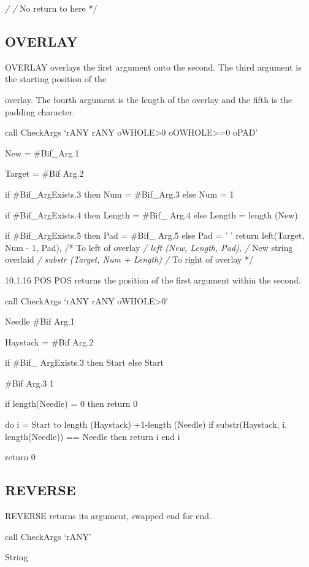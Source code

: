 \emph{/ /} No return to here */

\hypertarget{overlay}{%
\subsection{OVERLAY}\label{overlay}}

OVERLAY overlays the first argument onto the second. The third argument
is the starting position of the

overlay. The fourth argument is the length of the overlay and the fifth
is the padding character.

call CheckArgs `rANY rANY oWHOLE\textgreater0 oOWHOLE\textgreater=0
oPAD'

New = \#Bif\_Arg.1

Target = \#Bif Arg.2

if \#Bif\_ArgExists.3 then Num = \#Bif\_Arg.3 else Num = 1

if \#Bif\_ArgExists.4 then Length = \#Bif\_ Arg.4 else Length = length
(New)

if \#Bif\_ArgExists.5 then Pad = \#Bif\_ Arg.5 else Pad = ' ' return
left(Target, Num - 1, Pad), /* To left of overlay \emph{/
\textbar\textbar{} left (New, Length, Pad), /} New string overlaid
\emph{/ \textbar\textbar{} substr (Target, Num + Length) /} To right of
overlay */

10.1.16 POS POS returns the position of the first argument within the
second.

call CheckArgs `rANY rANY oWHOLE\textgreater0'

Needle \#Bif Arg.1

Haystack = \#Bif Arg.2

if \#Bif\_ ArgExists.3 then Start else Start

\#Bif Arg.3 1

if length(Needle) = 0 then return 0

do i = Start to length (Haystack) +1-length (Needle) if substr(Haystack,
i, length(Needle)) == Needle then return i end i

return 0

\hypertarget{reverse}{%
\subsection{REVERSE}\label{reverse}}

REVERSE returns its argument, swapped end for end.

call CheckArgs `rANY'

String

